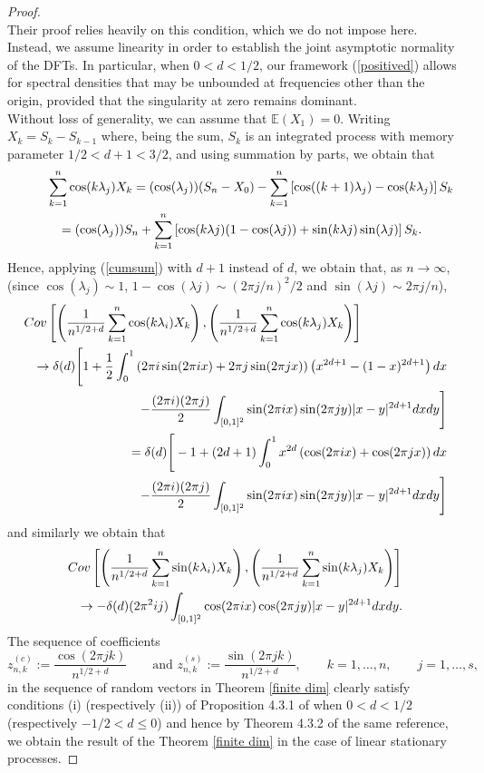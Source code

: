 \documentclass[10pt,a4paper]{amsart}
\numberwithin{equation}{section}
\begin{document}
\begin{proof}
\[\]
Their proof relies heavily on this condition, which we do not impose here. Instead, we assume linearity in order to establish the joint asymptotic normality of the DFTs. In particular, when $0<d<1/2$, our framework (\ref{positived}) allows for spectral densities that may be unbounded at frequencies other than the origin, provided that the singularity at zero remains dominant.\\
Without loss of generality, we can assume that $\mathbb{E}(X_1)=0$. Writing $X_k=S_k-S_{k-1}$ where, being the sum, $S_k$ is an integrated  process with memory parameter $1/2<d+1<3/2$, and using summation by parts, we obtain that 
\begin{eqnarray}\label{expansion}\lefteqn{
\sum_{k=1}^n\cos(k\lambda_{j})X_k=(\cos(\lambda_j))(S_n-X_0)-\sum_{k=1}^n\left[\cos((k+1)\lambda_j)-\cos(k\lambda_j)\right]S_k}\nonumber\\
&&=(\cos(\lambda_j))S_n+
\sum_{k=1}^n\left[\cos(k\lambda j)(1-\cos(\lambda j))+\sin(k\lambda j)\sin(\lambda j)\right]S_k.
\end{eqnarray}
Hence,  applying (\ref{cumsum}) with $d+1$ instead of $d$, we obtain that, as $n\to\infty$, (since  $\cos(\lambda_j)\sim1$, $1-\cos(\lambda j)\sim(2\pi j/n)^2/2$ and $\sin(\lambda j)\sim2\pi j/n$),
\begin{eqnarray}\label{match2}\lefteqn{
    \textrm{Cov}\left[\left(\frac{1} {n^{1/2+d}}\sum_{k=1}^n\cos(k\lambda_{i})X_k\right),\left(\frac{1}{n^{1/2+d}}\sum_{k=1}^n\cos(k\lambda_{j})X_k\right)\right]}\\
&&
\to\delta(d)\Bigg[1+\frac{1}{2}\int_0^1\left(2\pi i\sin(2\pi ix)+2\pi j\sin(2\pi jx)\right)\left(x^{2d+1}-(1-x)^{2d+1}\right)dx\nonumber\\
&&-\frac{(2\pi i)(2\pi j)}{2}\int_{[0,1]^2}\sin(2\pi ix)\sin(2\pi jy)\vert x- y\vert^{2d+1}dxdy\Bigg]\nonumber\\
&&=\delta(d)\Bigg[-1+(2d+1)\int_0^1x^{2d}\left(\cos(2\pi ix)+\cos(2\pi jx)\right)dx\nonumber\\
&&-\frac{(2\pi i)(2\pi j)}{2}\int_{[0,1]^2}\sin(2\pi ix)\sin(2\pi jy)\vert x- y\vert^{2d+1}dxdy\Bigg]
\end{eqnarray}
and similarly we obtain that
\begin{eqnarray*}\lefteqn{
    \textrm{Cov}\left[\left(\frac{1} {n^{1/2+d}}\sum_{k=1}^n\sin(k\lambda_{i})X_k\right),\left(\frac{1}{n^{1/2+d}}\sum_{k=1}^n\sin(k\lambda_{j})X_k\right)\right]}\\
&&\to-\delta(d)(2\pi^2 ij)\int_{[0,1]^2}\cos(2\pi ix)\cos(2\pi jy)\vert x- y\vert^{2d+1}dxdy.
\end{eqnarray*}
The sequence of coefficients 
$$
z^{(c)}_{n,k}:=\frac{\cos(2\pi jk)}{n^{1/2+d}}\qquad\textrm{and }z^{(s)}_{n,k}:=\frac{\sin(2\pi jk)}{n^{1/2+d}},\qquad k=1,\ldots,n,\qquad j=1,\ldots,s,
$$
in the sequence of random vectors in Theorem \ref{finite dim} clearly 
satisfy conditions (i)  (respectively (ii)) of Proposition 4.3.1 of  \cite{MR2977317} when $0<d<1/2$ (respectively $-1/2<d\le0$) and hence by Theorem 4.3.2 of the same reference, we obtain the result  of the Theorem \ref{finite dim} in the case of linear stationary processes. 
\end{proof}
\end{document}
